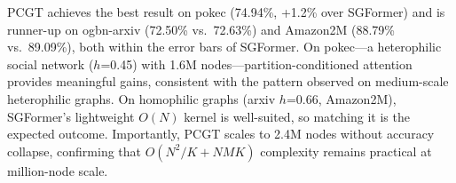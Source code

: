 \noindent PCGT achieves the best result on pokec (74.94\%, +1.2\% over SGFormer) and is runner-up on ogbn-arxiv (72.50\% vs.\ 72.63\%) and Amazon2M (88.79\% vs.\ 89.09\%), both within the error bars of SGFormer. On pokec---a heterophilic social network ($h$=0.45) with 1.6M nodes---partition-conditioned attention provides meaningful gains, consistent with the pattern observed on medium-scale heterophilic graphs. On homophilic graphs (arxiv $h$=0.66, Amazon2M), SGFormer's lightweight $O(N)$ kernel is well-suited, so matching it is the expected outcome. Importantly, PCGT scales to 2.4M nodes without accuracy collapse, confirming that $O(N^2/K + NMK)$ complexity remains practical at million-node scale.

\begin{figure}[t]
\centering
{}
\end{figure}
